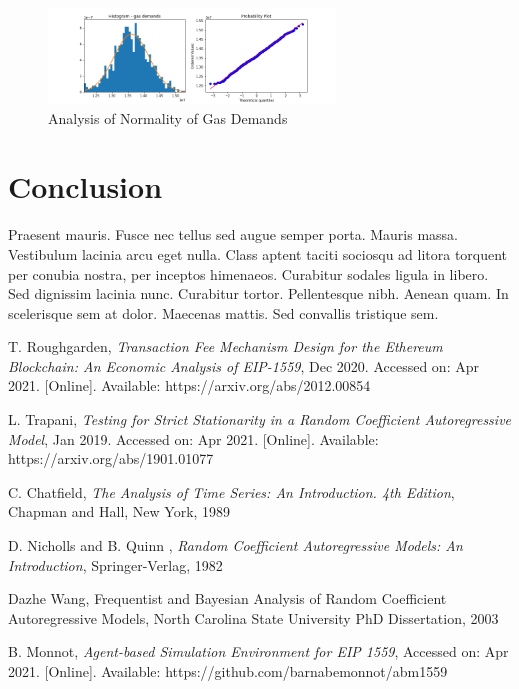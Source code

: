 \documentclass[peerreview]{ieeesyscoin}
\begin{document}
\begin{figure}[h!]
\includegraphics[width=3in]{img/gaussian_analysis.png}
\caption{Analysis of Normality of Gas Demands} 
\label{fig:gaussian_analysis}
\end{figure} 

\section{Conclusion}
\label{section:conclusion}
Praesent mauris. Fusce nec tellus sed augue semper porta. Mauris massa. Vestibulum lacinia arcu eget nulla. Class aptent taciti sociosqu ad litora torquent per conubia nostra, per inceptos himenaeos. Curabitur sodales ligula in libero. Sed dignissim lacinia nunc. Curabitur tortor. Pellentesque nibh. Aenean quam. In scelerisque sem at dolor. Maecenas mattis. Sed convallis tristique sem. 

\begin{thebibliography}{00}

 T. Roughgarden, \textit{Transaction Fee Mechanism Design for the Ethereum Blockchain: An Economic Analysis of EIP-1559}, Dec 2020. Accessed on: Apr 2021. [Online]. Available: https://arxiv.org/abs/2012.00854

 L. Trapani, \textit{Testing for Strict Stationarity in a Random Coefficient Autoregressive Model}, Jan 2019. Accessed on: Apr 2021. [Online]. Available: https://arxiv.org/abs/1901.01077

 C. Chatfield, \textit{The Analysis of Time Series: An Introduction. 4th Edition}, Chapman and Hall, New York, 1989

 D. Nicholls and B. Quinn , \textit{Random Coefficient Autoregressive Models: An Introduction}, Springer-Verlag, 1982

 Dazhe Wang, Frequentist and Bayesian Analysis of Random Coefficient Autoregressive Models, North Carolina State University PhD Dissertation, 2003

 B. Monnot, \textit{Agent-based Simulation Environment for EIP 1559}, Accessed on: Apr 2021.  [Online]. Available:  https://github.com/barnabemonnot/abm1559

\end{thebibliography}


\EOD
\end{document}
